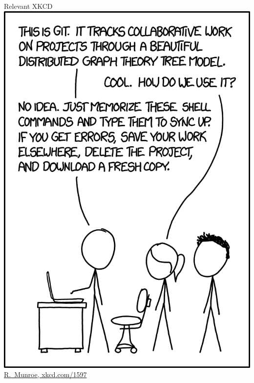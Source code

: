 \begin{frame}[t]{Relevant XKCD}%
  \centering%
  \includegraphics[height=0.95\textheight]{images/xkcd.png}%
  \href{https://xkcd.com/1597}{R.~Munroe, xkcd.com/1597}%
\end{frame}

